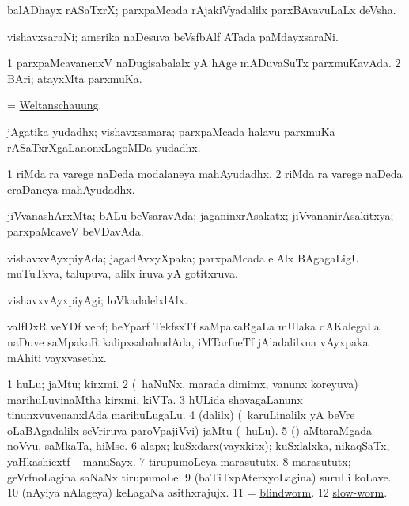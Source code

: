 \bentry 
{} 
\gl{\nA}
\expl{}
\bmng
balADhayx rASaTxrX; parxpaMcada rAjakiVyadalilx parxBAvavuLaLx deVsha. 
\emng
\eentry

\bentry
{} 
\gl{\nA}
\expl{}
\bmng
vishavxsaraNi; amerika naDesuva beVsfbAlf ATada paMdayxsaraNi. 
\emng
\eentry

\bentry
{} 
\gl{\gu}
\expl{}
\bmng
\bnum
\num{1} parxpaMcavanenxV naDugisabalalx yA hAge mADuvaSuTx parxmuKavAda. 
\num{2} BAri; atayxMta parxmuKa. 
\enum
\emng
\eentry

\bentry
{} 
\gl{\nA}
\expl{}
\bmng
= \hyperlink{Weltanschauung}{Weltanschauung}. 
\emng
\eentry

\bentry
{} 
\gl{\nA}
\expl{}
\bmng
jAgatika yudadhx; vishavxsamara; parxpaMcada halavu parxmuKa rASaTxrXgaLanonxLagoMDa yudadhx. 
\emng

\noindent
\gl{\pagu}
\expl{}
\bmng
\bnum
\num{1}   riMda ra varege naDeda modalaneya mahAyudadhx. 
\num{2}   riMda ra varege naDeda eraDaneya mahAyudadhx. 
\enum
\emng
\eentry

\bentry 
{} 
\gl{\gu}
\expl{}
\bmng
jiVvanashArxMta; bALu beVsaravAda; jaganinxrAsakatx; jiVvananirAsakitxya; parxpaMcaveV beVDavAda. 
\emng
\eentry

\bentry
{} 
\gl{\gu}
\expl{}
\bmng
vishavxvAyxpiyAda; jagadAvxyXpaka; parxpaMcada elAlx BAgagaLigU muTuTxva, talupuva, alilx iruva yA gotitxruva. 
\emng
\eentry

\bentry
{} 
\gl{\kirxvi}
\expl{}
\bmng
vishavxvAyxpiyAgi; loVkadalelxlAlx. 
\emng
\eentry

\bentry
{} 
\gl{\nA}
\expl{}
\bmng
valfDxR veYDf vebf; heYparf TekfsxTf saMpakaRgaLa mUlaka dAKalegaLa naDuve saMpakaR kalipxsabahudAda, iMTarfneTf jAladalilxna vAyxpaka mAhiti vayxvasethx. 
\emng
\eentry

\bentry
{} 
\gl{\nA}
\expl{}
\bmng
\bnum
\num{1} huLu; jaMtu; kirxmi. 
\num{2} (\kanmu\ haNuNx, marada dimimx, \mo vanunx koreyuva) marihuLuvinaMtha kirxmi, kiVTa. 
\num{3} hULida shavagaLanunx tinunxvuvenanxlAda marihuLugaLu. 
\num{4} (\bava dalilx) (\kanmu\ karuLinalilx yA beVre oLaBAgadalilx seVriruva paroVpajiVvi) jaMtu (\mo\ huLu). 
\num{5} (\rUpa) aMtaraMgada noVvu, saMkaTa, hiMse. 
\num{6} alapx; kuSxdarx(vayxkitx); kuSxlalxka, nikaqSaTx, yaHkashicxtf -- manuSayx. 
\num{7} tirupumoLeya marasututx. 
\num{8} marasututx; geVrfnoLagina saNaNx tirupumoLe. 
\num{9} (baTiTxpAterxyoLagina) suruLi koLave. 
\num{10} (nAyiya nAlageya) keLagaNa asithxrajujx. 
\num{11} = \hyperref{kandict_b.pdf}{B}{blindworm}{blindworm}. 
\num{12} \hyperref{kandict_s.pdf}{S}{slow-worm}{slow-worm}. 
\enum
\emng


